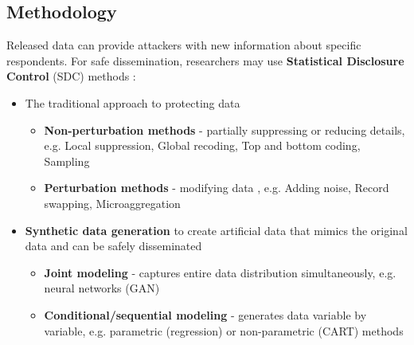 \documentclass[a0,portrait]{a0poster}
\begin{document}
\begin{multicols}{3}
\section{Methodology}



Released data can provide attackers with new information about specific respondents. For safe dissemination, researchers may use \textbf{Statistical Disclosure Control} (SDC) methods \cite{2017_Templ}:

\begin{itemize}
    \item[\ding{228}] The traditional approach to protecting data
        \begin{itemize}
            \item[\textbullet] \textbf{Non-perturbation methods} - partially suppressing or reducing details, e.g. Local suppression, %
            Global recoding, %
            Top and bottom coding, Sampling  
            \item[\textbullet] \textbf{Perturbation methods} - modifying data%
            , e.g. Adding noise, Record swapping,  Microaggregation
        \end{itemize}   
\end{itemize}

\begin{itemize}
     \item[\ding{228}] \textbf{Synthetic data generation} to create artificial data that mimics the original data and can be safely disseminated
        \begin{itemize}
            \item[\textbullet] \textbf{Joint modeling}  - captures entire data distribution simultaneously, e.g. neural networks (GAN)
            \item[\textbullet] \textbf{Conditional/sequential modeling} - generates data variable by variable, e.g. parametric (regression) or non-parametric (CART) methods
        \end{itemize}        
\end{itemize}


\end{multicols}
\end{document}
